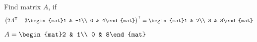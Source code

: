 
\begin{Exercise}[
name={},
title={}, 
difficulty=0,
origin={\cite{OV}}]
Find matrix $A$, if
\[
\trans{\left(2\trans{A}-3\begin{mat}1 & -1\\ 0 & 4\end{mat}\right)}=\begin{mat}1 & 2\\ 3 & 3\end{mat}
\]
\end{Exercise}

\begin{Answer}
$A=\begin{mat}2 & 1\\ 0 & 8\end{mat}$
\end{Answer}
